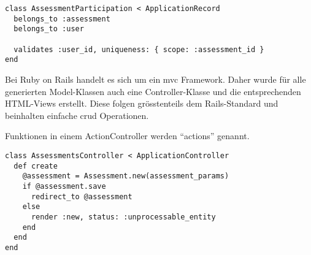 \begin{codebox}
\begin{verbatim}
class AssessmentParticipation < ApplicationRecord
  belongs_to :assessment
  belongs_to :user

  validates :user_id, uniqueness: { scope: :assessment_id }
end
\end{verbatim}
\end{codebox}

Bei Ruby on Rails handelt es sich um ein \gls{mvc} Framework. Daher wurde für alle generierten Model-Klassen
auch eine Controller-Klasse und die entsprechenden HTML-Views erstellt. Diese folgen grösstenteils dem Rails-Standard \cite{default_controller_actions} und beinhalten einfache \gls{crud} Operationen.

Funktionen in einem ActionController werden \enquote{actions} genannt. 
\begin{codebox}
\begin{verbatim}
class AssessmentsController < ApplicationController
  def create
    @assessment = Assessment.new(assessment_params)
    if @assessment.save
      redirect_to @assessment
    else
      render :new, status: :unprocessable_entity
    end
  end
end
\end{verbatim}
\end{codebox}
